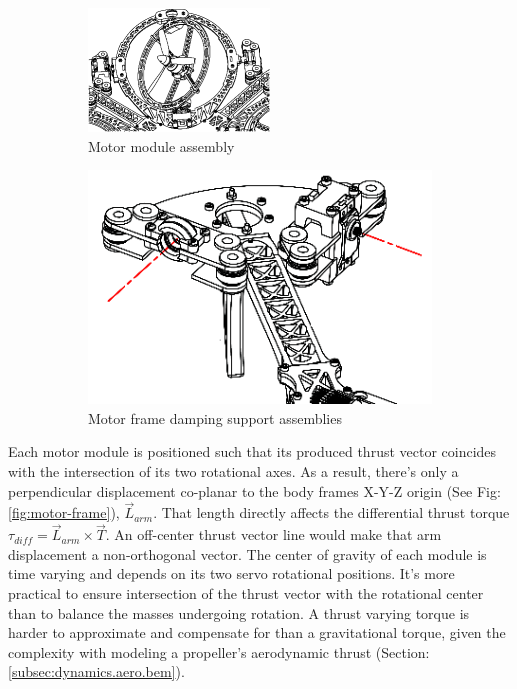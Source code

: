 \begin{figure}[hbtp]
\begin{subfigure}{.5\textwidth}
\centering
\includegraphics[width=\textwidth]{figs/motor-assembly}
\caption{Motor module assembly}
\label{fig:motor-assembly}
\end{subfigure}
\begin{subfigure}{.5\textwidth}
\centering
\includegraphics[width=\textwidth]{figs/motor-support}
\caption{Motor frame damping support assemblies}
\label{fig:motor_support}
\end{subfigure}
\caption{}
\end{figure}
Each motor module is positioned such that its produced thrust vector coincides with the intersection of its two rotational axes. As a result, there's only a perpendicular displacement co-planar to the body frames X-Y-Z origin (See Fig:\ref{fig:motor-frame}), $\vec{L}_{arm}$. That length directly affects the differential thrust torque $\tau_{diff}=\vec{L}_{arm}\times\vec{T}$. An off-center thrust vector line would make that arm displacement a non-orthogonal vector. The center of gravity of each module is time varying and depends on its two servo rotational positions. It's more practical to ensure intersection of the thrust vector with the rotational center than to balance the masses undergoing rotation. A thrust varying torque is harder to approximate and compensate for than a gravitational torque, given the complexity with modeling a propeller's aerodynamic thrust (Section:\ref{subsec:dynamics.aero.bem}).
